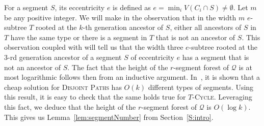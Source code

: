 \documentclass{article}
\numberwithin{claimcounter}{lemma}
\newcommand{\tcycle}{$T$-\textsc{Cycle}\xspace}
\newcommand{\dispaths}{\textsc{Disjoint Paths}\xspace}
\begin{document}
For a segment $S$, its eccentricity $e$ is defined as $e = \min_i V(C_i \cap S)\neq \emptyset$. Let $m$ be any positive integer. We will make in  the observation that in the width $m$ $e$-subtree $T$ rooted at the $k$-th generation ancestor of $S$, either all ancestors of $S$ in $T$ have the same type or there is a segment in $T$  that is not an ancestor of $S$. This observation coupled with  will tell us that the width three $e$-subtree rooted at the $3$-rd generation ancestor of a segment $S$ of eccentricity $e$ has a segment that is not an ancestor of $S$. The fact that the height of the $r$-segment forest of $\mathcal{Q}$ is at most logarithmic follows then from an inductive argument. 
In~\cite[Lemma 5]{JCTB}, it is shown that a cheap solution for  \dispaths has  $O(k)$ different types of segments. Using this result, it is easy to check that the same holds true for \tcycle.
Leveraging this fact, we deduce that the height of the $r$-segment forest of $\mathcal{Q}$ is $O(\log k)$. This gives us Lemma~\ref{lem:segmentNumber} from Section~\ref{S:intro}.
\end{document}
